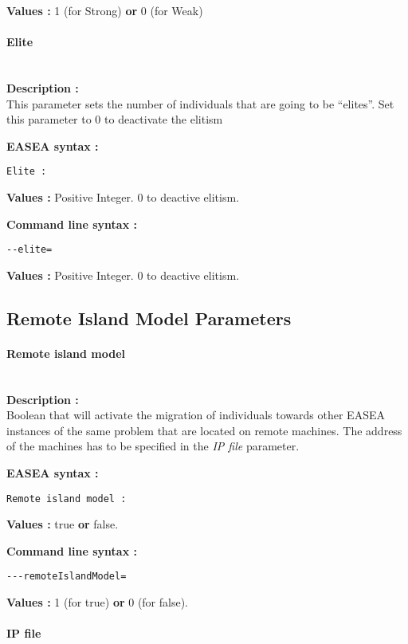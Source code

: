 \documentclass{book}
\begin{document}
\textbf{Values :} 1 (for Strong) \textbf{or} 0 (for Weak)

\paragraph{Elite}\label{elite}
~\\

\textbf{Description :}\\This parameter sets the number of individuals
that are going to be ``elites''. Set this parameter to 0 to deactivate
the elitism

\textbf{EASEA syntax :}

\texttt{Elite~:}

\textbf{Values :} Positive Integer. 0 to deactive elitism.

\textbf{Command line syntax :}

\texttt{-{}-elite=}

\textbf{Values :} Positive Integer. 0 to deactive elitism.

\subsection{Remote Island Model
Parameters}\label{remote-island-model-parameters}

\paragraph{Remote island model}\label{remote-island-model}
~\\

\textbf{Description :}\\Boolean that will activate the migration of
individuals towards other EASEA instances of the same problem that are
located on remote machines. The address of the machines has to be
specified in the \emph{IP file} parameter.

\textbf{EASEA syntax :}

\texttt{Remote~island~model~:}

\textbf{Values :} true \textbf{or} false.

\textbf{Command line syntax :}

\texttt{-{}-{}-remoteIslandModel=}

\textbf{Values :} 1 (for true) \textbf{or} 0 (for false).

\paragraph{IP file}\label{ip-file}
~\\
\end{document}

